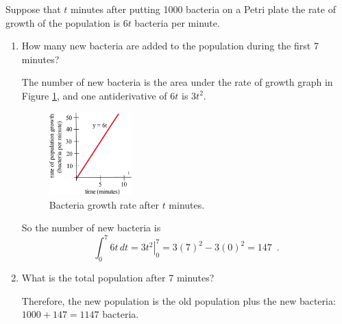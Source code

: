 \begin{example}
Suppose that $t$ minutes after putting 1000 bacteria on a Petri plate the rate of growth of the population is $6t$ bacteria per minute.
  \begin{enumerate}[label = (\alph*)]
    \item How many new bacteria are added to the population during the first 7 minutes?

    \begin{solution}
      The number of new bacteria is the area under the rate of growth graph in Figure \ref{fig:5-5-bacteria}, and one antiderivative of $6t$ is $3t^2$.

      \begin{figure}[!ht]
        \centering
          \includegraphics[width=0.3\textwidth]{img/chap5/image045.png}
          \caption{Bacteria growth rate after $t$ minutes.}
          \label{fig:5-5-bacteria}
      \end{figure}
      So the number of new bacteria is
      $$\int_0^7 6t\,dt = \left. 3t^2 \right|_0^7 = 3(7)^2-3(0)^2 = 147 \enspace .$$
      \end{solution}
    \item What is the total population after 7 minutes?

    \begin{solution}
      Therefore, the new population is the old population plus the new bacteria: $1000 + 147 = 1147$ bacteria.
      \end{solution}
  \end{enumerate}
\end{example}

